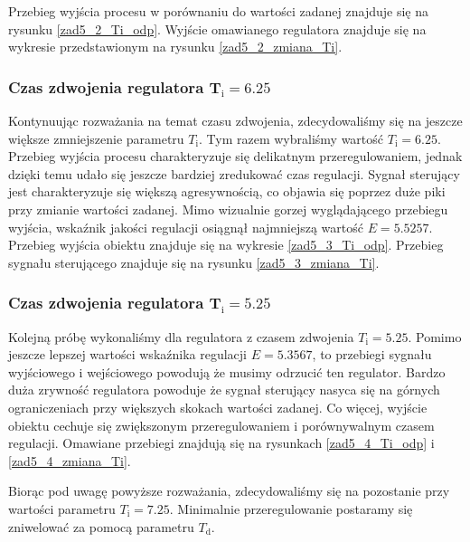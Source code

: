 Przebieg wyjścia procesu w porównaniu do wartości zadanej znajduje się na rysunku \ref{zad5_2_Ti_odp}.
Wyjście omawianego regulatora znajduje się na wykresie przedstawionym na rysunku \ref{zad5_2_zmiana_Ti}. 

\subsubsection{Czas zdwojenia regulatora $\mathbf{T_{\mathrm{i}}}=\num{6,25}$}
Kontynuując rozważania na temat czasu zdwojenia, zdecydowaliśmy się na jeszcze większe zmniejszenie 
parametru $T_{\mathrm{i}}$. Tym razem wybraliśmy wartość $T_{\mathrm{i}}=\num{6,25}$. Przebieg 
wyjścia procesu charakteryzuje się delikatnym przeregulowaniem, jednak dzięki temu udało się
jeszcze bardziej zredukować czas regulacji. Sygnał sterujący jest charakteryzuje się
większą agresywnością, co objawia się poprzez duże piki przy zmianie wartości zadanej.
Mimo wizualnie gorzej wyglądającego przebiegu wyjścia, wskaźnik jakości regulacji osiągnął najmniejszą
wartość $E=\num{5,5257}$. Przebieg wyjścia obiektu znajduje się na wykresie \ref{zad5_3_Ti_odp}. 
Przebieg sygnału sterującego znajduje się na rysunku \ref{zad5_3_zmiana_Ti}.

\subsubsection{Czas zdwojenia regulatora $\mathbf{T_{\mathrm{i}}}=\num{5,25}$}
Kolejną próbę wykonaliśmy dla regulatora z czasem zdwojenia $T_{\mathrm{i}}=\num{5,25}$. Pomimo
jeszcze lepszej wartości wskaźnika regulacji $E=\num{5,3567}$, to przebiegi sygnału wyjściowego i wejściowego
powodują że musimy odrzucić ten regulator. Bardzo duża zrywność regulatora powoduje że 
sygnał sterujący nasyca się na górnych ograniczeniach przy większych skokach wartości zadanej. Co więcej,
wyjście obiektu cechuje się zwiększonym przeregulowaniem i porównywalnym czasem regulacji. Omawiane przebiegi
znajdują się na rysunkach \ref{zad5_4_Ti_odp} i \ref{zad5_4_zmiana_Ti}. 

Biorąc pod uwagę powyższe rozważania, zdecydowaliśmy się na pozostanie przy wartości parametru $T_{\mathrm{i}} = \num{7,25}$.
Minimalnie przeregulowanie postaramy się zniwelować za pomocą parametru $T_{\mathrm{d}}$. 


